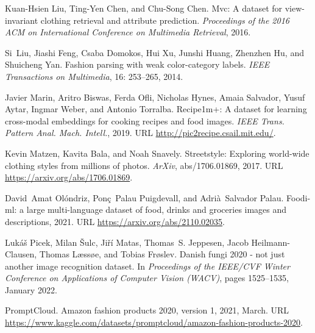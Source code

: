 \documentclass{bmvc2k}
\begin{document}
\begin{thebibliography}{63}
Kuan-Hsien Liu, Ting-Yen Chen, and Chu-Song Chen.
\newblock Mvc: A dataset for view-invariant clothing retrieval and attribute
  prediction.
\newblock \emph{Proceedings of the 2016 ACM on International Conference on
  Multimedia Retrieval}, 2016.

Si~Liu, Jiashi Feng, Csaba Domokos, Hui Xu, Junshi Huang, Zhenzhen Hu, and
  Shuicheng Yan.
\newblock Fashion parsing with weak color-category labels.
\newblock \emph{IEEE Transactions on Multimedia}, 16: 253--265, 2014.

Javier Marin, Aritro Biswas, Ferda Ofli, Nicholas Hynes, Amaia Salvador, Yusuf
  Aytar, Ingmar Weber, and Antonio Torralba.
\newblock Recipe1m+: A dataset for learning cross-modal embeddings for cooking
  recipes and food images.
\newblock \emph{{IEEE} Trans. Pattern Anal. Mach. Intell.}, 2019.
\newblock URL \url{http://pic2recipe.csail.mit.edu/}.

Kevin Matzen, Kavita Bala, and Noah Snavely.
\newblock Streetstyle: Exploring world-wide clothing styles from millions of
  photos.
\newblock \emph{ArXiv}, abs/1706.01869, 2017.
\newblock URL \url{https://arxiv.org/abs/1706.01869}.

David~Amat Olóndriz, Ponç~Palau Puigdevall, and Adrià~Salvador Palau.
\newblock Foodi-ml: a large multi-language dataset of food, drinks and
  groceries images and descriptions, 2021.
\newblock URL \url{https://arxiv.org/abs/2110.02035}.

Lukáš Picek, Milan Šulc, Jiří Matas, Thomas~S. Jeppesen, Jacob
  Heilmann-Clausen, Thomas L{\ae}ss{\o}e, and Tobias Fr{\o}slev.
\newblock Danish fungi 2020 - not just another image recognition dataset.
\newblock In \emph{Proceedings of the IEEE/CVF Winter Conference on
  Applications of Computer Vision (WACV)}, pages 1525--1535, January 2022.

PromptCloud.
\newblock Amazon fashion products 2020, version 1, 2021, March.
\newblock URL
  \url{https://www.kaggle.com/datasets/promptcloud/amazon-fashion-products-2020}.


\end{thebibliography}
\end{document}
